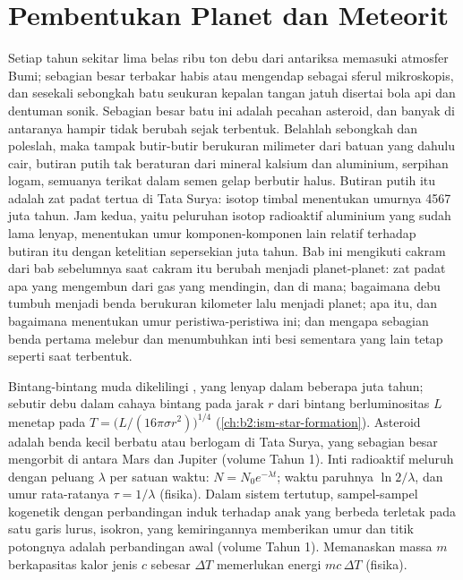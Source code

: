 \chapter{Pembentukan Planet dan Meteorit}\label{ch:b2:planet-formation-meteorites}

Setiap tahun sekitar lima belas ribu ton debu dari antariksa memasuki atmosfer Bumi;
sebagian besar terbakar habis atau mengendap sebagai sferul mikroskopis, dan sesekali
sebongkah batu seukuran kepalan tangan jatuh disertai bola api dan dentuman sonik.
Sebagian besar batu ini adalah pecahan asteroid, dan banyak di antaranya hampir tidak
berubah sejak terbentuk. Belahlah sebongkah dan poleslah, maka tampak butir-butir
berukuran milimeter dari batuan yang dahulu cair, butiran putih tak beraturan dari mineral
kalsium dan aluminium, serpihan logam, semuanya terikat dalam semen gelap berbutir halus.
Butiran putih itu adalah zat padat tertua di Tata Surya: isotop timbal menentukan umurnya
4567 juta tahun. Jam kedua, yaitu peluruhan isotop radioaktif aluminium yang sudah lama
lenyap, menentukan umur komponen-komponen lain relatif terhadap butiran itu dengan ketelitian
sepersekian juta tahun. Bab ini mengikuti cakram dari bab sebelumnya saat cakram itu
berubah menjadi planet-planet: zat padat apa yang mengembun dari gas yang mendingin, dan di
mana; bagaimana debu tumbuh menjadi benda berukuran kilometer lalu menjadi planet; apa
 itu, dan bagaimana  menentukan umur peristiwa-peristiwa ini; dan mengapa
sebagian benda pertama melebur dan menumbuhkan inti besi sementara yang lain tetap seperti
saat terbentuk.

\begin{recall}
Bintang-bintang muda dikelilingi , yang lenyap dalam beberapa juta
tahun; sebutir debu dalam cahaya bintang pada jarak $r$ dari bintang berluminositas
$L$ menetap pada $T = \bigl(L/(16\pi\sigma r^2)\bigr)^{1/4}$
(\cref{ch:b2:ism-star-formation}). Asteroid adalah benda kecil berbatu atau berlogam
di Tata Surya, yang sebagian besar mengorbit di antara Mars dan Jupiter (volume
Tahun 1). Inti radioaktif meluruh dengan peluang $\lambda$ per satuan
waktu: $N = N_0 e^{-\lambda t}$; waktu paruhnya $\ln 2/\lambda$, dan umur
rata-ratanya $\tau = 1/\lambda$ (fisika). Dalam sistem tertutup, sampel-sampel kogenetik
dengan perbandingan induk terhadap anak yang berbeda terletak pada satu garis lurus, isokron,
yang kemiringannya memberikan umur dan titik potongnya adalah perbandingan awal (volume Tahun 1).
Memanaskan massa $m$ berkapasitas kalor jenis $c$ sebesar $\Delta T$ memerlukan energi
$mc\,\Delta T$ (fisika).
\end{recall}

